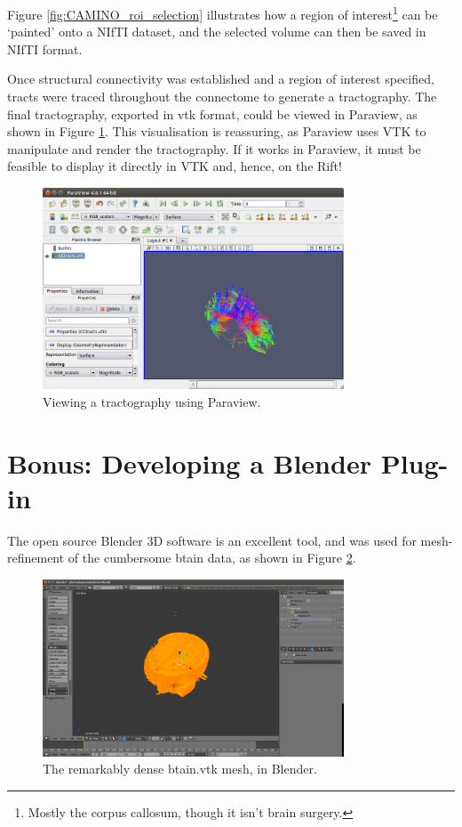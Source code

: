 \documentclass[MSc,paper=a4,pagesize=auto]{icldt}
\begin{document}
Figure \ref{fig:CAMINO_roi_selection} illustrates how a region of interest\footnote{Mostly the corpus callosum, though it isn't brain surgery.} can be `painted' onto a NIfTI dataset, and the selected volume can then be saved in NIfTI format.

Once structural connectivity was established and a region of interest specified, tracts were traced throughout the connectome to generate a tractography. The final tractography, exported in vtk format, could be viewed in Paraview, as shown in Figure \ref{fig:CAMINO_paraview}. This visualisation is reassuring, as Paraview uses VTK to manipulate and render the tractography. If it works in Paraview, it must be feasible to display it directly in VTK and, hence, on the Rift!

\begin{figure}[htbp!]
    \centering
    \includegraphics[width=0.8\textwidth]{resources/CAMINO_paraview}
    \caption{Viewing a tractography using Paraview.}
    \label{fig:CAMINO_paraview}
\end{figure}

\section{Bonus: Developing a Blender Plug-in}
The open source Blender 3D software is an excellent tool, and was used for mesh-refinement of the cumbersome btain data, as shown in Figure \ref{fig:blender_brain}. 

\begin{figure}[htbp!]
    \centering
    \includegraphics[width=0.8\textwidth]{resources/blender_brain}
    \caption{The remarkably dense btain.vtk mesh, in Blender.}
    \label{fig:blender_brain}
\end{figure}
\end{document}
